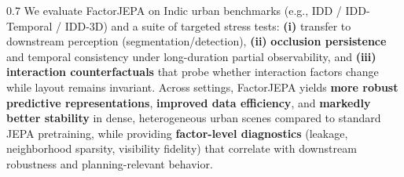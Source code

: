 \documentclass[11pt]{article}
\begin{document}
\begin{abstractbox}
\begin{spacing}{0.7}
We evaluate FactorJEPA on Indic urban benchmarks (e.g., IDD / IDD-Temporal / IDD-3D) and a suite of targeted stress tests:
\textbf{(i)} transfer to downstream perception (segmentation/detection),
\textbf{(ii)} \textbf{occlusion persistence} and temporal consistency under long-duration partial observability, and
\textbf{(iii)} \textbf{interaction counterfactuals} that probe whether interaction factors change while layout remains invariant.
Across settings, FactorJEPA yields \textbf{more robust predictive representations}, \textbf{improved data efficiency}, and \textbf{markedly better stability} in dense, heterogeneous urban scenes compared to standard JEPA pretraining, while providing \textbf{factor-level diagnostics} (leakage, neighborhood sparsity, visibility fidelity) that correlate with downstream robustness and planning-relevant behavior.



\end{spacing}





\end{abstractbox}
\end{document}
